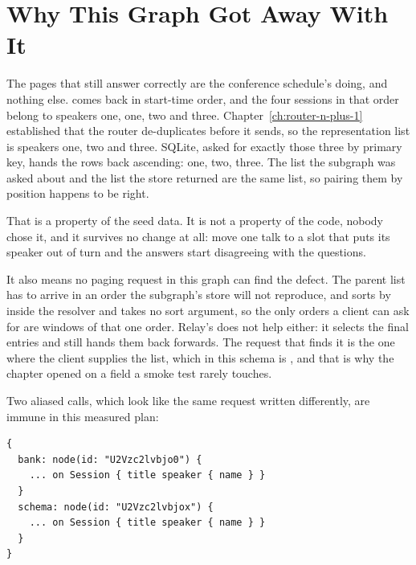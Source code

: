 \section{Why This Graph Got Away With It}
\label{sec:ch11-why-this-graph-got-away-with-it}

%
The pages that still answer correctly are the conference schedule's doing, and
nothing else.
 comes back in start-time order, and the four sessions in that
order belong to speakers one, one, two and three.
Chapter~\ref{ch:router-n-plus-1} established that the router de-duplicates
before it sends, so the representation list is speakers one, two and three.
SQLite, asked for exactly those three by primary key, hands the rows back
ascending: one, two, three. The list the subgraph was asked about and the list
the store returned are the same list, so pairing them by position happens to
be right.

%
That is a property of the seed data. It is not a property of the code, nobody
chose it, and it survives no change at all: move one talk to a slot that puts
its speaker out of turn and the answers start disagreeing with the questions.

%
It also means no paging request in this graph can find the defect. The parent
list has to arrive in an order the subgraph's store will not reproduce, and
 sorts by  inside the resolver and takes no sort
argument, so the only orders a client can ask for are windows of that one
order. Relay's  does not help either: it selects the final entries
and still hands them back forwards. The request that finds it is the one where
the client supplies the list, which in this schema is , and
that is why the chapter opened on a field a smoke test rarely touches.

%
Two aliased  calls, which look like the same request written
differently, are immune in this measured plan:

\begin{verbatim}
{
  bank: node(id: "U2Vzc2lvbjo0") {
    ... on Session { title speaker { name } }
  }
  schema: node(id: "U2Vzc2lvbjox") {
    ... on Session { title speaker { name } }
  }
}
\end{verbatim}

